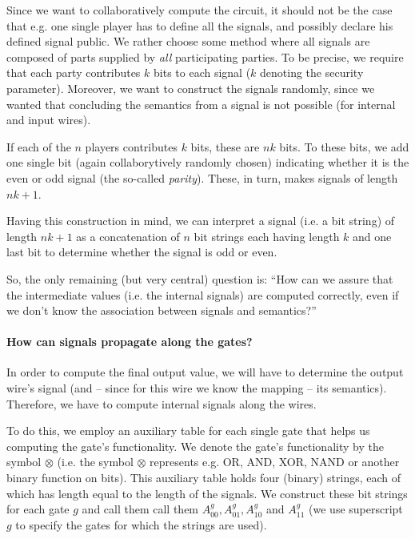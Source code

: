 \message{ !name(seminar.tex)}\documentclass{llncs}
\begin{document}
Since we want to collaboratively compute the circuit, it should not be the case that e.g. one single player has to define all the signals, and possibly declare his defined signal public. We rather choose some method where all signals are composed of parts supplied by \emph{all} participating parties. To be precise, we require that each party contributes $k$ bits to each signal ($k$ denoting the security parameter). Moreover, we want to construct the signals randomly, since we wanted that concluding the semantics from a signal is not possible (for internal and input wires).

If each of the $n$ players contributes $k$ bits, these are $nk$ bits. To these bits, we add one single bit (again collaborytively randomly chosen) indicating whether it is the even or odd signal (the so-called \emph{parity}). These, in turn, makes signals of length $nk+1$.

Having this construction in mind, we can interpret a signal (i.e. a bit string) of length $nk+1$ as a concatenation of $n$ bit strings each having length $k$ and one last bit to determine whether the signal is odd or even.

So, the only remaining (but very central) question is: ``How can we assure that the intermediate values (i.e. the internal signals) are computed correctly, even if we don't know the association between signals and semantics?''

\paragraph{How can signals propagate along the gates?}
\label{sec:how-can-signals-propagate}

In order to compute the final output value, we will have to determine the output wire's signal (and -- since for this wire we know the mapping -- its semantics). Therefore, we have to compute internal signals along the wires.

To do this, we employ an auxiliary table for each single gate that helps us computing the gate's functionality. We denote the gate's functionality by the symbol $\otimes$ (i.e. the symbol $\otimes$ represents e.g. OR, AND, XOR, NAND or another binary function on bits). This auxiliary table holds four (binary) strings, each of which has length equal to the length of the signals. We construct these bit strings for each gate $g$ and call them call them $A_{00}^g,A_{01}^g,A_{10}^g$ and $A_{11}^g$ (we use superscript $g$ to specify the gates for which the strings are used). 
\end{document}
